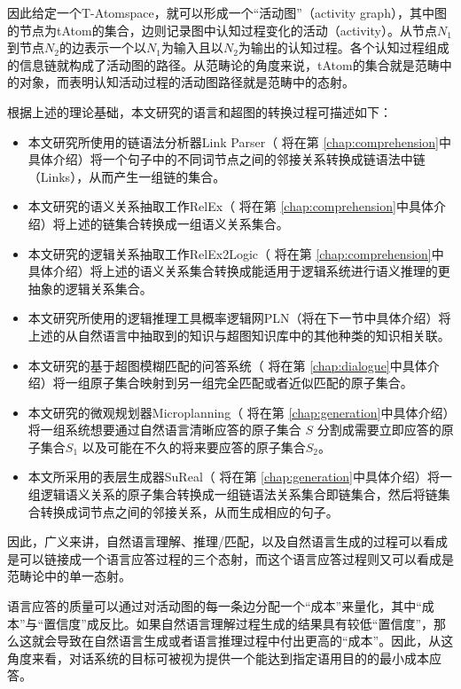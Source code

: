 因此给定一个T-Atomspace，就可以形成一个“活动图”（activity graph），其中图的节点为tAtom的集合，边则记录图中认知过程变化的活动（activity）。从节点$N_1$ 到节点$N_2$的边表示一个以$N_1$为输入且以$N_2$为输出的认知过程。各个认知过程组成的信息链就构成了活动图的路径。从范畴论的角度来说，tAtom的集合就是范畴中的对象，而表明认知活动过程的活动图路径就是范畴中的态射。

根据上述的理论基础，本文研究的语言和超图的转换过程可描述如下：

\begin{itemize}
\item 本文研究所使用的链语法分析器Link Parser（ 将在第 \ref{chap:comprehension}中具体介绍）将一个句子中的不同词节点之间的邻接关系转换成链语法中链（Links），从而产生一组链的集合。
\item 本文研究的语义关系抽取工作RelEx（ 将在第 \ref{chap:comprehension}中具体介绍）将上述的链集合转换成一组语义关系集合。
\item 本文研究的逻辑关系抽取工作RelEx2Logic（ 将在第 \ref{chap:comprehension}中具体介绍）将上述的语义关系集合转换成能适用于逻辑系统进行语义推理的更抽象的逻辑关系集合。
\item 本文研究所使用的逻辑推理工具概率逻辑网PLN（将在下一节中具体介绍）将上述的从自然语言中抽取到的知识与超图知识库中的其他种类的知识相关联。
\item 本文研究的基于超图模糊匹配的问答系统（ 将在第 \ref{chap:dialogue}中具体介绍）将一组原子集合映射到另一组完全匹配或者近似匹配的原子集合。
\item 本文研究的微观规划器Microplanning（ 将在第 \ref{chap:generation}中具体介绍）将一组系统想要通过自然语言清晰应答的原子集合 $S$ 分割成需要立即应答的原子集合$S_1$ 以及可能在不久的将来要应答的原子集合$S_2$。
\item 本文所采用的表层生成器SuReal（ 将在第 \ref{chap:generation}中具体介绍）将一组逻辑语义关系的原子集合转换成一组链语法关系集合即链集合，然后将链集合转换成词节点之间的邻接关系，从而生成相应的句子。
\end{itemize}

因此，广义来讲，自然语言理解、推理/匹配，以及自然语言生成的过程可以看成是可以链接成一个语言应答过程的三个态射，而这个语言应答过程则又可以看成是范畴论中的单一态射。

语言应答的质量可以通过对活动图的每一条边分配一个“成本”来量化，其中“成本”与“置信度”成反比。如果自然语言理解过程生成的结果具有较低“置信度”，那么这就会导致在自然语言生成或者语言推理过程中付出更高的“成本”。因此，从这角度来看，对话系统的目标可被视为提供一个能达到指定语用目的的最小成本应答。


